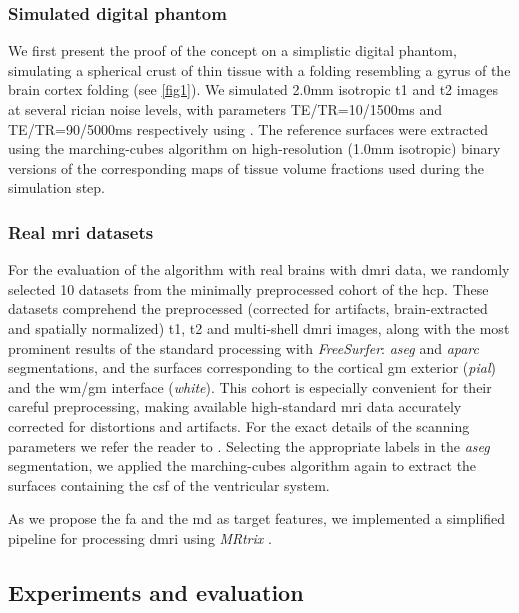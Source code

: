 \subsubsection{Simulated digital phantom} %
\label{sec:digital_phantoms}
%
We first present the proof of the concept on a simplistic digital phantom,
  simulating a spherical crust of thin tissue with a folding resembling
  a gyrus of the brain cortex folding (see \autoref{fig1}).
We simulated 2.0mm isotropic \gls*{t1} and \gls*{t2} images at
  several rician noise levels, with parameters TE/TR=10/1500ms and
  TE/TR=90/5000ms respectively using \cite{caruyer_phantomas_2014}.
The reference surfaces were extracted using the marching-cubes algorithm
  on high-resolution (1.0mm isotropic) binary versions of the corresponding
  maps of tissue volume fractions used during the simulation step.

\subsubsection{Real \gls{mri} datasets} %
\label{sec:human_connectome}
%
For the evaluation of the algorithm with real brains with \gls*{dmri} data,
  we randomly selected 10 datasets from the minimally preprocessed
  \citep{glasser_minimal_2013} cohort of the \gls*{hcp}.
These datasets comprehend the preprocessed (corrected for artifacts,
  brain-extracted and spatially normalized) \gls*{t1}, \gls*{t2} and
  multi-shell \gls*{dmri} images, along with the most prominent results of
  the standard processing with \emph{FreeSurfer}: \emph{aseg} and
  \emph{aparc} segmentations, and the surfaces corresponding to the cortical
  \gls*{gm} exterior (\emph{pial}) and the \gls*{wm}/\gls*{gm} interface
  (\emph{white}).
This cohort is especially convenient for their careful preprocessing,
  making available high-standard \gls*{mri} data accurately corrected
  for distortions and artifacts.
For the exact details of the scanning parameters we refer the reader to
  \citep{essen_human_2012}.
Selecting the appropriate labels in the \emph{aseg} segmentation, we applied
  the marching-cubes algorithm again to extract the surfaces containing the
  \gls*{csf} of the ventricular system.

As we propose the \gls*{fa} and the \gls*{md} as target features, we
  implemented a simplified pipeline for processing \gls*{dmri} using
  \emph{MRtrix} \citep{tournier_mrtrix_2012}.

\subsection{Experiments and evaluation}
\label{sec:experiments_evaluation}
%
